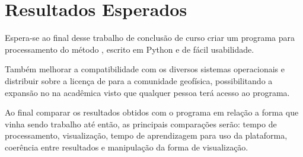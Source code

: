 \chapter{Resultados Esperados}
    \label{cap-resultados}
    Espera-se ao final desse trabalho de conclusão de curso criar um programa para processamento do método \MT, escrito em Python e de fácil usabilidade.
    
    Também melhorar a compatibilidade com os diversos sistemas operacionais e distribuir sobre a licença de  para a comunidade geofísica, possibilitando a expansão no \MT na acadêmica visto que qualquer pessoa terá acesso ao programa.
    
    Ao final comparar os resultados obtidos com o programa em relação a forma que vinha sendo trabalho até então, as principais comparações serão: tempo de processamento, visualização, tempo de aprendizagem para uso da plataforma, coerência entre resultados e manipulação da forma de visualização. 
    
    
